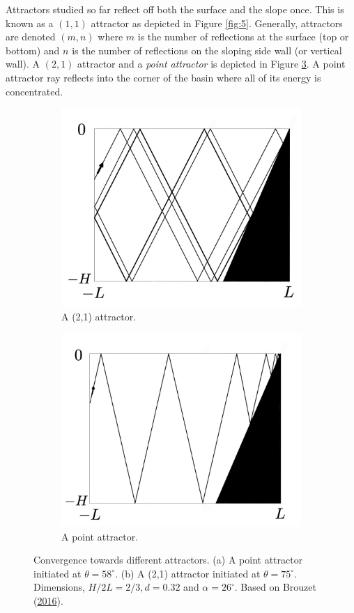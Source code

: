 \documentclass[a4paper]{article}
\numberwithin{equation}{section}
\begin{document}
Attractors studied so far reflect off both the surface and the slope once. This is known as a $(1,1)$ attractor as depicted in Figure \ref{fig:5}. Generally, attractors are denoted $(m, n)$ where $m$ is the number of reflections at the surface (top or bottom) and $n$ is the number of reflections on the sloping side wall (or vertical wall). A $(2, 1)$ attractor and a \emph{point attractor} is depicted in Figure \ref{fig:6}. A point attractor ray reflects into the corner of the basin where all of its energy is concentrated. 
\begin{figure}[h!]
\centering
\begin{subfigure}[t]{.5\textwidth}
  \centering
  \includegraphics[width=0.78\linewidth]{Images/other attractors.jpeg}
  \caption{A (2,1) attractor.}
  \label{fig:sub1}
\end{subfigure}%
\begin{subfigure}[t]{.5\textwidth}
  \centering
  \includegraphics[width=0.8\linewidth]{Images/other attractors 2.jpeg}
  \caption{A point attractor.}
  \label{fig:sub2}
\end{subfigure}
\caption{Convergence towards different attractors. (a) A point attractor initiated at $\theta = 58^{\circ}$. (b) A (2,1) attractor initiated at $\theta = 75^{\circ}$. Dimensions, $H/2L = 2/3, d = 0.32$ and $\alpha = 26^{\circ}$. Based on Brouzet (\protect\hyperlink{ref 9}{2016}).}
\label{fig:6}
\end{figure}
\end{document}
